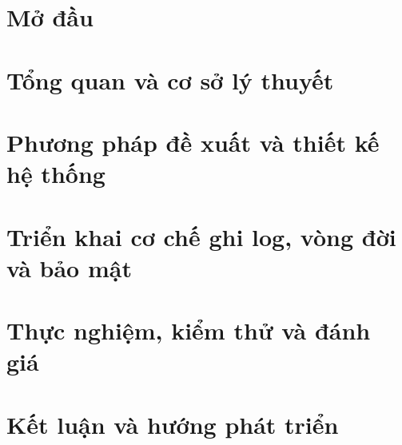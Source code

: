 \documentclass{template/thesis}
\begin{document}
\secondbeforepreface
\setcounter{page}{1}
\newpage
\afterpreface


\clearpage

\chapter{Mở đầu}
\label{c:intro}


\chapter{Tổng quan và cơ sở lý thuyết}
\label{c:cosolythuyet}


\chapter{Phương pháp đề xuất và thiết kế hệ thống}
\label{ch:proposed}


\chapter{Triển khai cơ chế ghi log, vòng đời và bảo mật}
\label{c:implementation}


\chapter{Thực nghiệm, kiểm thử và đánh giá}
\label{c:evaluation}



\chapter{Kết luận và hướng phát triển}
\label{c:conclusion}



% 

\begingroup
\setlength{\emergencystretch}{8em}
\justifying\printbibliography[title=Tài liệu tham khảo]
\endgroup
{}

% 
\end{document}
